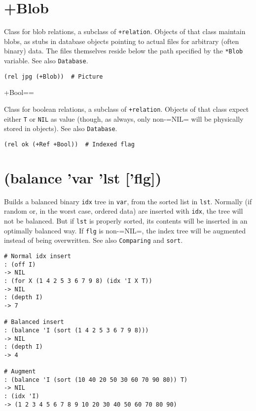 { 
\section{+Blob}
\label{sec-8-1-2-4}


Class for blob relations, a subclass of \texttt{+relation}. Objects of that
class maintain blobs, as stubs in database objects pointing to actual
files for arbitrary (often binary) data. The files themselves reside
below the path specified by the \texttt{*Blob} variable. See also \texttt{Database}.


\begin{verbatim}
(rel jpg (+Blob))  # Picture
\end{verbatim}

+Bool==

Class for boolean relations, a subclass of \texttt{+relation}. Objects of that
class expect either \texttt{T} or \texttt{NIL} as value (though, as always, only
non-=NIL= will be physically stored in objects). See also \texttt{Database}.


\begin{verbatim}
(rel ok (+Ref +Bool))  # Indexed flag
\end{verbatim}

 
\section{(balance 'var 'lst ['flg])}
\label{sec-8-1-2-5}


Builds a balanced binary \texttt{idx} tree in \texttt{var}, from the sorted list in
\texttt{lst}. Normally (if random or, in the worst case, ordered data) are
inserted with \texttt{idx}, the tree will not be balanced. But if \texttt{lst} is
properly sorted, its contents will be inserted in an optimally balanced
way. If \texttt{flg} is non-=NIL=, the index tree will be augmented instead of
being overwritten. See also \texttt{Comparing} and \texttt{sort}.


\begin{verbatim}
# Normal idx insert
: (off I)
-> NIL
: (for X (1 4 2 5 3 6 7 9 8) (idx 'I X T))
-> NIL
: (depth I)
-> 7

# Balanced insert
: (balance 'I (sort (1 4 2 5 3 6 7 9 8)))
-> NIL
: (depth I)
-> 4

# Augment
: (balance 'I (sort (10 40 20 50 30 60 70 90 80)) T)
-> NIL
: (idx 'I)
-> (1 2 3 4 5 6 7 8 9 10 20 30 40 50 60 70 80 90)
\end{verbatim}

 
}
